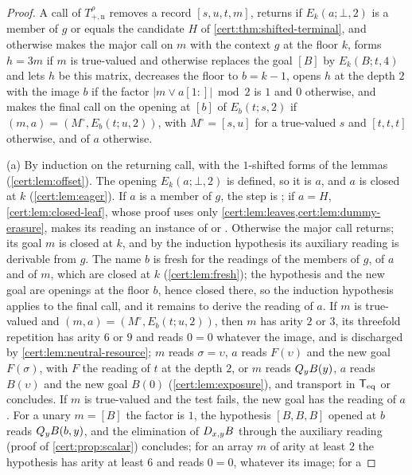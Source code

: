 \begin{proof}
A call of $T^{\rho}_{+,\mathrm n}$ removes a record $[s,u,t,m]$, returns if
$E_k(a;\bot,2)$ is a member of $g$ or equals the candidate $H$ of
\cref{cert:thm:shifted-terminal}, and otherwise makes the major call on $m$ with the
context $g$ at the floor $k$, forms $h=3m$ if $m$ is true-valued and otherwise
replaces the goal $[B]$ by $E_k(B;t,4)$ and lets $h$ be this matrix, decreases the
floor to $b=k-1$, opens $h$ at the depth $2$ with the image $b$ if the factor
$\lvert m\lor a[1{:}]\rvert\bmod 2$ is $1$ and $0$ otherwise, and makes the final call
on the opening at $[b]$ of $E_b(t;s,2)$ if $(m,a)=(M^{\circ},E_b(t;u,2))$, with
$M^{\circ}=[s,u]$ for a true-valued $s$ and $[t,t,t]$ otherwise, and of $a$ otherwise.

(a) By induction on the returning call, with the $1$-shifted forms of the lemmas
(\cref{cert:lem:offset}). The opening $E_k(a;\bot,2)$ is defined, so it is $a$, and
$a$ is closed at $k$ (\cref{cert:lem:eager}). If $a$ is a member of $g$, the step is
; if $a=H$, \cref{cert:lem:closed-leaf}, whose proof uses only
\cref{cert:lem:leaves,cert:lem:dummy-erasure}, makes its reading an instance of
 or . Otherwise the major call returns; its goal $m$ is
closed at $k$, and by the induction hypothesis its auxiliary reading is derivable
from $g$. The name $b$ is fresh for the readings of the members of $g$, of $a$ and of
$m$, which are closed at $k$ (\cref{cert:lem:fresh}); the hypothesis and the new goal
are openings at the floor $b$, hence closed there, so the induction hypothesis
applies to the final call, and it remains to derive the reading of $a$.
If $m$ is true-valued and $(m,a)=(M^{\circ},E_b(t;u,2))$, then $m$ has arity $2$ or
$3$, its threefold repetition has arity $6$ or $9$ and reads $0=0$ whatever the
image, and is discharged by \cref{cert:lem:neutral-resource}; $m$ reads $\sigma=\upsilon$,
$a$ reads $F(\upsilon)$ and the new goal $F(\sigma)$, with $F$ the reading of $t$ at the
depth $2$, or $m$ reads $Q_{y}B(y)$, $a$ reads $B(\upsilon)$ and the new goal $B(0)$
(\cref{cert:lem:exposure}), and transport in $\mathsf{T}_{\mathrm{eq}}$ or  concludes. If
$m$ is true-valued and the test fails, the new goal has the reading of $a$. For a
unary $m=[B]$ the factor is $1$, the hypothesis $[B,B,B]$ opened at $b$ reads
$Q_{y}B(b,y)$, and the elimination of $D_{x,y}B$ through the auxiliary reading
(proof of \cref{cert:prop:scalar}) concludes; for an array $m$ of arity at least $2$
the hypothesis has arity at least $6$ and reads $0=0$, whatever its image; for a

\end{proof}
